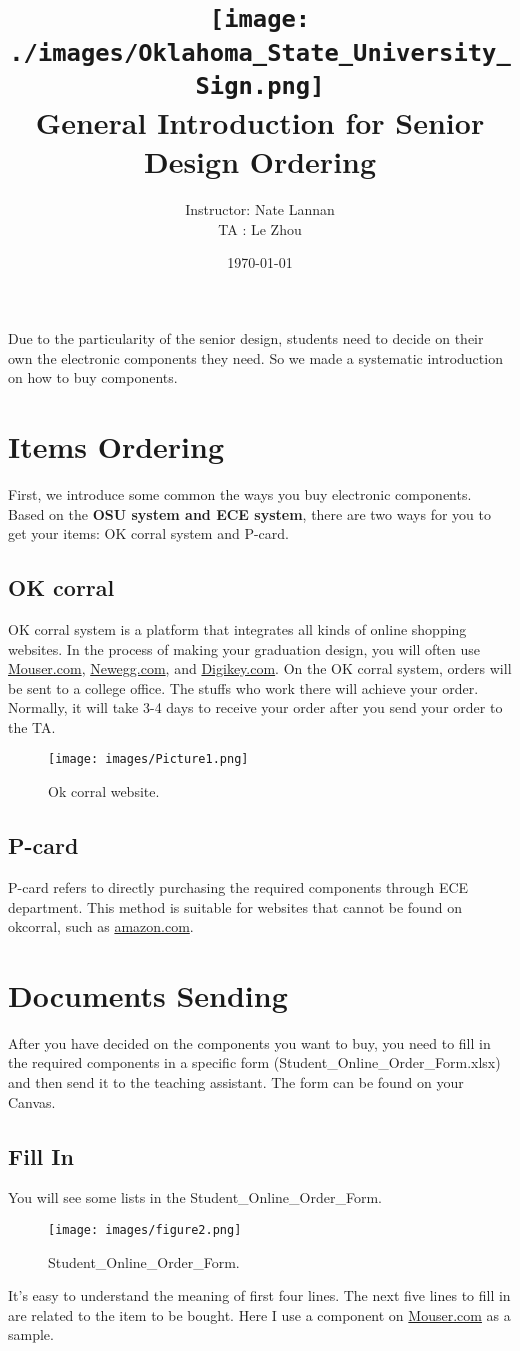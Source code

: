 \documentclass[10pt,oneside,fleqn]{article}
\title{
{\texttt{[image: ./images/Oklahoma\_State\_University\_Sign.png]}}\\
{\large \textbf{General Introduction for Senior Design Ordering }}\\
}
\author{Instructor: Nate Lannan \\
        TA        : Le Zhou}
\date{\today}
\newcommand{\gray}{\textcolor{gray!60}}
\begin{document}
\rfoot{\gray \thepage}

\maketitle

\tableofcontents
\newpage
\newpage
Due to the particularity of the senior design, students need to decide on their own the electronic components they need. So we made a systematic introduction on how to buy components.
\section{Items Ordering}
First, we introduce some common the ways you buy electronic components. Based on the \textbf{ OSU system and ECE system}, there are two ways for you to get your items: OK corral system and P-card. 
\subsection{OK corral}
OK corral system is a platform that integrates all kinds of online shopping websites. In the process of making your graduation design, you will often use \url{Mouser.com}, \url{Newegg.com}, and \url{Digikey.com}. On the OK corral system, orders will be sent to a college office. The stuffs who work there will achieve your order. Normally, it will take 3-4 days to receive your order after you send your order to the TA.
\begin{figure}[h]
    \centering
    \texttt{[image: images/Picture1.png]}
    \caption{Ok corral website.}
    \label{okcorral}
\end{figure} \vspace{-5mm}
\subsection{P-card}
P-card refers to directly purchasing the required components through ECE department. This method is suitable for websites that cannot be found on okcorral, such as \url{amazon.com}.
\section{Documents Sending}
After you have decided on the components you want to buy, you need to fill in the required components in a specific form (Student\_Online\_Order\_Form.xlsx) and then send it to the teaching assistant. The form can be found on your Canvas.
\subsection{Fill In}
You will see some lists in the Student\_Online\_Order\_Form. 
\begin{figure}[H]
    \centering
    \texttt{[image: images/figure2.png]}
    \caption{Student\_Online\_Order\_Form.}
\end{figure} \vspace{-5mm}
It's easy to understand the meaning of first four lines. The next five lines to fill in are related to the item to be bought. Here I use a component on \url{Mouser.com} as a sample.
\end{document}

